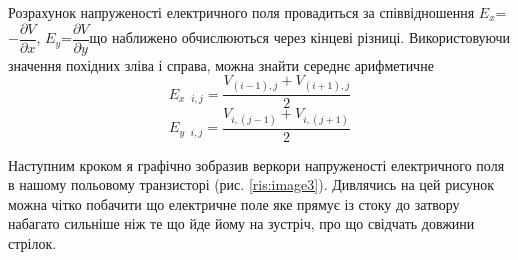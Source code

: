 \documentclass[14pt,a4paper]{scrartcl}
\begin{document}
\newpage

Розрахунок напруженості електричного поля провадиться за співвідношення $E_x$=$-\dfrac{\partial V}{\partial x}$, $E_y$=$\dfrac{\partial V}{\partial y}$що наближено обчислюються через кінцеві різниці. Використовуючи значення похідних зліва і справа, можна знайти середнє арифметичне
\begin{equation}
E_{x\text{ }i,j} = \dfrac{V_{(i-1),j}  + V_{(i+1),j}}{2}
\label{eq:ref}
\end{equation}
\begin{equation}
E_{y\text{ }i,j} = \dfrac{V_{i,(j-1)}  + V_{i,(j+1)}}{2}
\label{eq:ref}
\end{equation}








 


Наступним кроком я графічно зобразив веркори напруженості електричного поля в нашому польовому транзисторі (рис. \ref{ris:image3}). Дивлячись на цей рисунок можна чітко побачити що електричне поле яке прямує із стоку до затвору набагато сильніше ніж те що йде йому на зустріч, про що свідчать довжини стрілок.\\
\end{document}
